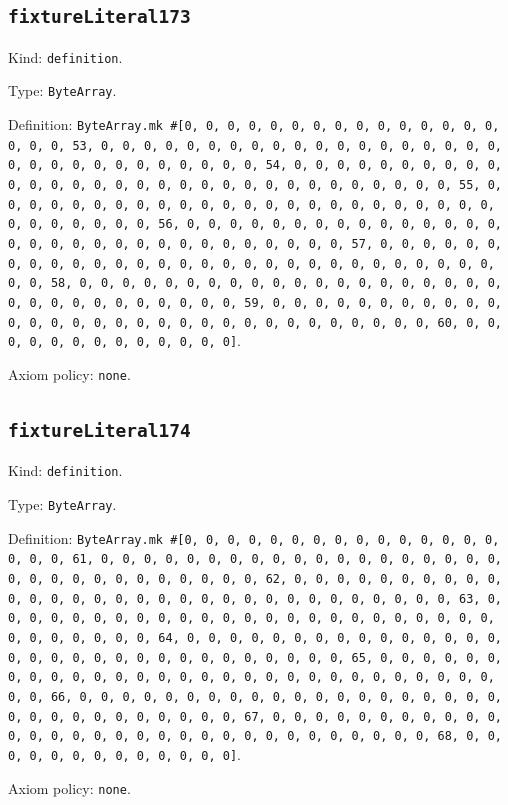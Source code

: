 \documentclass[11pt]{article}
\begin{document}
\subsection*{\texttt{fixtureLiteral173}}
\noindent Kind: \texttt{definition}.\par
\noindent Type: \texttt{ByteArray}.\par
\noindent Definition: \texttt{ByteArray.mk \#[0, 0, 0, 0, 0, 0, 0, 0, 0, 0, 0, 0, 0, 0, 0, 0, 0, 0, 53, 0, 0, 0, 0, 0, 0, 0, 0, 0, 0, 0, 0, 0, 0, 0, 0, 0, 0, 0, 0, 0, 0, 0, 0, 0, 0, 0, 0, 0, 0, 0, 54, 0, 0, 0, 0, 0, 0, 0, 0, 0, 0, 0, 0, 0, 0, 0, 0, 0, 0, 0, 0, 0, 0, 0, 0, 0, 0, 0, 0, 0, 0, 0, 55, 0, 0, 0, 0, 0, 0, 0, 0, 0, 0, 0, 0, 0, 0, 0, 0, 0, 0, 0, 0, 0, 0, 0, 0, 0, 0, 0, 0, 0, 0, 0, 56, 0, 0, 0, 0, 0, 0, 0, 0, 0, 0, 0, 0, 0, 0, 0, 0, 0, 0, 0, 0, 0, 0, 0, 0, 0, 0, 0, 0, 0, 0, 0, 57, 0, 0, 0, 0, 0, 0, 0, 0, 0, 0, 0, 0, 0, 0, 0, 0, 0, 0, 0, 0, 0, 0, 0, 0, 0, 0, 0, 0, 0, 0, 0, 58, 0, 0, 0, 0, 0, 0, 0, 0, 0, 0, 0, 0, 0, 0, 0, 0, 0, 0, 0, 0, 0, 0, 0, 0, 0, 0, 0, 0, 0, 0, 0, 59, 0, 0, 0, 0, 0, 0, 0, 0, 0, 0, 0, 0, 0, 0, 0, 0, 0, 0, 0, 0, 0, 0, 0, 0, 0, 0, 0, 0, 0, 0, 0, 60, 0, 0, 0, 0, 0, 0, 0, 0, 0, 0, 0, 0, 0]}.\par
\noindent Axiom policy: \texttt{none}.\par
\subsection*{\texttt{fixtureLiteral174}}
\noindent Kind: \texttt{definition}.\par
\noindent Type: \texttt{ByteArray}.\par
\noindent Definition: \texttt{ByteArray.mk \#[0, 0, 0, 0, 0, 0, 0, 0, 0, 0, 0, 0, 0, 0, 0, 0, 0, 0, 61, 0, 0, 0, 0, 0, 0, 0, 0, 0, 0, 0, 0, 0, 0, 0, 0, 0, 0, 0, 0, 0, 0, 0, 0, 0, 0, 0, 0, 0, 0, 0, 62, 0, 0, 0, 0, 0, 0, 0, 0, 0, 0, 0, 0, 0, 0, 0, 0, 0, 0, 0, 0, 0, 0, 0, 0, 0, 0, 0, 0, 0, 0, 0, 63, 0, 0, 0, 0, 0, 0, 0, 0, 0, 0, 0, 0, 0, 0, 0, 0, 0, 0, 0, 0, 0, 0, 0, 0, 0, 0, 0, 0, 0, 0, 0, 64, 0, 0, 0, 0, 0, 0, 0, 0, 0, 0, 0, 0, 0, 0, 0, 0, 0, 0, 0, 0, 0, 0, 0, 0, 0, 0, 0, 0, 0, 0, 0, 65, 0, 0, 0, 0, 0, 0, 0, 0, 0, 0, 0, 0, 0, 0, 0, 0, 0, 0, 0, 0, 0, 0, 0, 0, 0, 0, 0, 0, 0, 0, 0, 66, 0, 0, 0, 0, 0, 0, 0, 0, 0, 0, 0, 0, 0, 0, 0, 0, 0, 0, 0, 0, 0, 0, 0, 0, 0, 0, 0, 0, 0, 0, 0, 67, 0, 0, 0, 0, 0, 0, 0, 0, 0, 0, 0, 0, 0, 0, 0, 0, 0, 0, 0, 0, 0, 0, 0, 0, 0, 0, 0, 0, 0, 0, 0, 68, 0, 0, 0, 0, 0, 0, 0, 0, 0, 0, 0, 0, 0]}.\par
\noindent Axiom policy: \texttt{none}.\par
\end{document}
